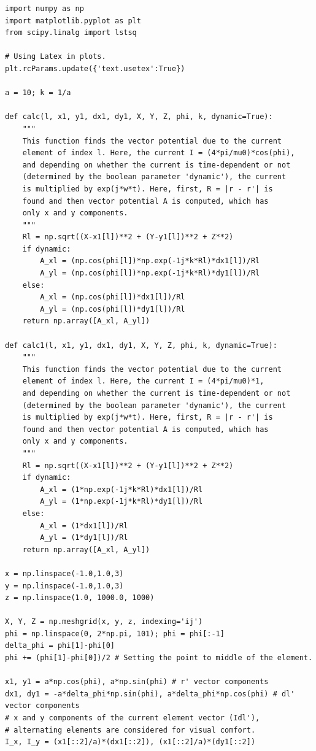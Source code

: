 \documentclass[12pt, a4paper]{article}
\begin{document}
\begin{lstlisting}
import numpy as np
import matplotlib.pyplot as plt
from scipy.linalg import lstsq

# Using Latex in plots.
plt.rcParams.update({'text.usetex':True})

a = 10; k = 1/a

def calc(l, x1, y1, dx1, dy1, X, Y, Z, phi, k, dynamic=True):
    """
    This function finds the vector potential due to the current
    element of index l. Here, the current I = (4*pi/mu0)*cos(phi),
    and depending on whether the current is time-dependent or not
    (determined by the boolean parameter 'dynamic'), the current
    is multiplied by exp(j*w*t). Here, first, R = |r - r'| is 
    found and then vector potential A is computed, which has 
    only x and y components.
    """
    Rl = np.sqrt((X-x1[l])**2 + (Y-y1[l])**2 + Z**2)
    if dynamic:
        A_xl = (np.cos(phi[l])*np.exp(-1j*k*Rl)*dx1[l])/Rl
        A_yl = (np.cos(phi[l])*np.exp(-1j*k*Rl)*dy1[l])/Rl
    else:
        A_xl = (np.cos(phi[l])*dx1[l])/Rl
        A_yl = (np.cos(phi[l])*dy1[l])/Rl
    return np.array([A_xl, A_yl])

def calc1(l, x1, y1, dx1, dy1, X, Y, Z, phi, k, dynamic=True):
    """
    This function finds the vector potential due to the current
    element of index l. Here, the current I = (4*pi/mu0)*1,
    and depending on whether the current is time-dependent or not
    (determined by the boolean parameter 'dynamic'), the current
    is multiplied by exp(j*w*t). Here, first, R = |r - r'| is 
    found and then vector potential A is computed, which has 
    only x and y components.
    """
    Rl = np.sqrt((X-x1[l])**2 + (Y-y1[l])**2 + Z**2)
    if dynamic:
        A_xl = (1*np.exp(-1j*k*Rl)*dx1[l])/Rl
        A_yl = (1*np.exp(-1j*k*Rl)*dy1[l])/Rl
    else:
        A_xl = (1*dx1[l])/Rl
        A_yl = (1*dy1[l])/Rl
    return np.array([A_xl, A_yl])

x = np.linspace(-1.0,1.0,3)  
y = np.linspace(-1.0,1.0,3)
z = np.linspace(1.0, 1000.0, 1000)

X, Y, Z = np.meshgrid(x, y, z, indexing='ij')
phi = np.linspace(0, 2*np.pi, 101); phi = phi[:-1]
delta_phi = phi[1]-phi[0]
phi += (phi[1]-phi[0])/2 # Setting the point to middle of the element.

x1, y1 = a*np.cos(phi), a*np.sin(phi) # r' vector components
dx1, dy1 = -a*delta_phi*np.sin(phi), a*delta_phi*np.cos(phi) # dl' vector components
# x and y components of the current element vector (Idl'), 
# alternating elements are considered for visual comfort.
I_x, I_y = (x1[::2]/a)*(dx1[::2]), (x1[::2]/a)*(dy1[::2])


\end{lstlisting}
\end{document}
